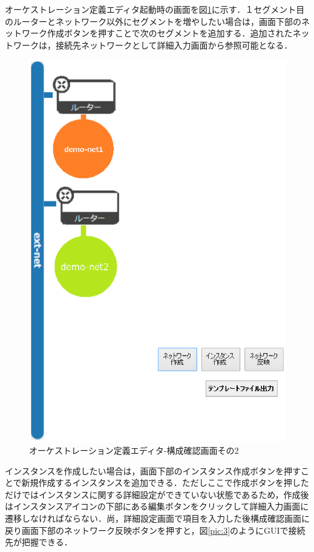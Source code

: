 \documentclass[mingoth]{kut-paper}		%
\begin{document}
		オーケストレーション定義エディタ起動時の画面を図\ref{pic:2}に示す．１セグメント目のルーターとネットワーク以外にセグメントを増やしたい場合は，画面下部のネットワーク作成ボタンを押すことで次のセグメントを追加する．追加されたネットワークは，接続先ネットワークとして詳細入力画面から参照可能となる．
		\begin{figure}[H]
			\begin{center}
				\includegraphics[scale=0.55]{Document/構成確認画面2.eps}
				\caption{オーケストレーション定義エディタ-構成確認画面その2}
				\label{pic:2}
			\end{center}
		\end{figure}
		インスタンスを作成したい場合は，画面下部のインスタンス作成ボタンを押すことで新規作成するインスタンスを追加できる．ただしここで作成ボタンを押しただけではインスタンスに関する詳細設定ができていない状態であるため，作成後はインスタンスアイコンの下部にある編集ボタンをクリックして詳細入力画面に遷移しなければならない．尚，詳細設定画面で項目を入力した後構成確認画面に戻り画面下部のネットワーク反映ボタンを押すと，図\ref{pic:3}のようにGUIで接続先が把握できる．
\end{document}
